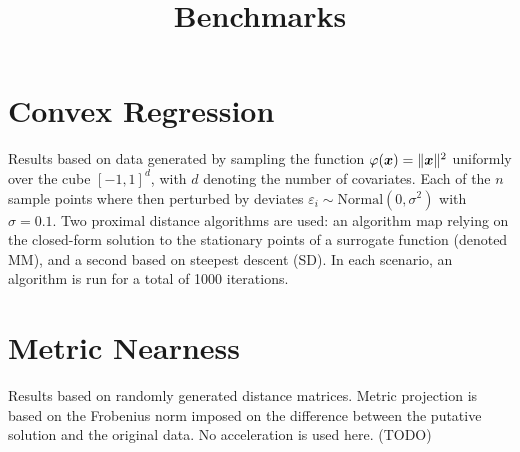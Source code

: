 \documentclass[11pt]{article}
\title{Benchmarks}
\author{}
\begin{document}
\maketitle

\section*{\center Convex Regression}

Results based on data generated by sampling the function \(\varphi(\boldsymbol{x}) = \|\boldsymbol{x}\|^{2}\) uniformly over the cube \([-1,1]^{d}\), with \(d\) denoting the number of covariates.
Each of the \(n\) sample points where then perturbed by deviates \(\varepsilon_{i} \sim \mathrm{Normal}(0, \sigma^{2})\) with \(\sigma = 0.1\).
Two proximal distance algorithms are used: an algorithm map relying on the closed-form solution to the stationary points of a surrogate function (denoted MM), and a second based on steepest descent (SD).
In each scenario, an algorithm is run for a total of 1000 iterations.

\newpage



\newpage

\section*{\center Metric Nearness}

Results based on randomly generated distance matrices.
Metric projection is based on the Frobenius norm imposed on the difference between the putative solution and the original data.
No acceleration is used here. (TODO)

\newpage



    
\end{document}
